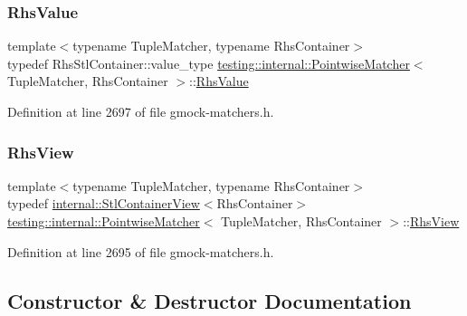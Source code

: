\subsubsection{\texorpdfstring{Rhs\+Value}{RhsValue}}
{\footnotesize\ttfamily template$<$typename Tuple\+Matcher, typename Rhs\+Container$>$ \\
typedef Rhs\+Stl\+Container\+::value\+\_\+type \hyperlink{classtesting_1_1internal_1_1PointwiseMatcher}{testing\+::internal\+::\+Pointwise\+Matcher}$<$ Tuple\+Matcher, Rhs\+Container $>$\+::\hyperlink{classtesting_1_1internal_1_1PointwiseMatcher_a9f7f1abbfa795033e1e1c1df385b4617}{Rhs\+Value}}



Definition at line 2697 of file gmock-\/matchers.\+h.

\mbox{\label{classtesting_1_1internal_1_1PointwiseMatcher_a215d397bfaf0f8bc948cb7b5ff9100c9}} 
\subsubsection{\texorpdfstring{Rhs\+View}{RhsView}}
{\footnotesize\ttfamily template$<$typename Tuple\+Matcher, typename Rhs\+Container$>$ \\
typedef \hyperlink{classtesting_1_1internal_1_1StlContainerView}{internal\+::\+Stl\+Container\+View}$<$Rhs\+Container$>$ \hyperlink{classtesting_1_1internal_1_1PointwiseMatcher}{testing\+::internal\+::\+Pointwise\+Matcher}$<$ Tuple\+Matcher, Rhs\+Container $>$\+::\hyperlink{classtesting_1_1internal_1_1PointwiseMatcher_a215d397bfaf0f8bc948cb7b5ff9100c9}{Rhs\+View}}



Definition at line 2695 of file gmock-\/matchers.\+h.



\subsection{Constructor \& Destructor Documentation}
\mbox{\label{classtesting_1_1internal_1_1PointwiseMatcher_aa6e63218a93062d5055428462417821f}} 
